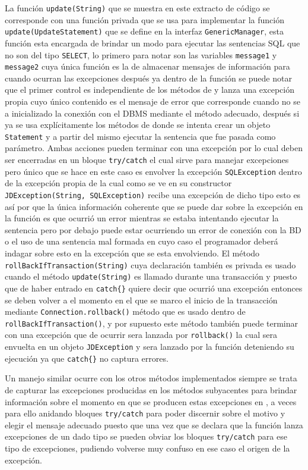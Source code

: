 La función \verb=update(String)= que se muestra en este extracto de código se corresponde con una función privada que se usa para implementar la función \verb=update(UpdateStatement)= que se define en la interfaz \verb=GenericManager=, esta función esta encargada de brindar un modo para ejecutar las sentencias SQL que no son del tipo \verb=SELECT=, lo primero para notar son las variables \verb=message1= y \verb=message2= cuya única función es la de almacenar mensajes de información para cuando ocurran las excepciones después ya dentro de la función se puede notar que el primer control es independiente de los métodos de \jd y lanza una excepción propia  cuyo único contenido es el mensaje de error que corresponde cuando no se a inicializado la conexión con el DBMS mediante el método adecuado, después si ya se usa explícitamente los métodos de \jd donde se intenta crear un objeto \verb=Statement= y a partir del mismo ejecutar la sentencia que fue pasada como parámetro. Ambas acciones pueden terminar con una excepción por lo cual deben ser encerradas en un bloque \verb=try/catch= el cual sirve para manejar excepciones pero único que se hace en este caso es envolver la excepción \verb=SQLException= dentro de la excepción propia de \jd la cual como se ve en su constructor \verb=JDException(String, SQLException)= recibe una excepción de dicho tipo esto es así por que la única información coherente que se puede dar sobre la excepción en la función es que ocurrió un error mientras se estaba intentando ejecutar la sentencia pero por debajo puede estar ocurriendo un error de conexión con la BD o el uso de una sentencia mal formada en cuyo caso el programador deberá indagar sobre esto en la excepción que se esta envolviendo. El método \verb=rollBackIfTransaction(String)= cuya declaración también es privada es usado cuando el método \verb=update(String)= es llamado durante una transacción y puesto que de haber entrado en \verb=catch{}= quiere decir que ocurrió una excepción entonces se deben volver a el momento en el que se marco el inicio de la transacción mediante \verb=Connection.rollback()= método que es usado dentro de \verb=rollBackIfTransaction()=, y por supuesto este método también puede terminar con una excepción que de ocurrir sera lanzada por \verb=rollback()= la cual sera envuelta en un objeto \verb=JDException= y sera lanzado por la función  deteniendo su ejecución ya que \verb=catch{}= no captura errores.

Un manejo similar ocurre con los otros métodos implementados siempre se trata de capturar las excepciones producidas en los métodos subyacentes para brindar información sobre el momento en que se producen estas excepciones en \jj, a veces para ello anidando bloques \verb=try/catch= para poder discernir sobre el motivo y elegir el mensaje adecuado puesto que una vez que se declara que la función lanza excepciones de un dado tipo se pueden obviar los bloques \verb=try/catch= para ese tipo de excepciones, pudiendo volverse muy confuso en ese caso el origen de la excepción.
%

